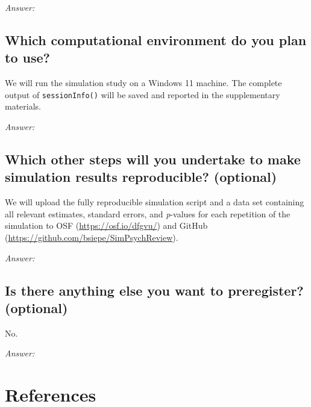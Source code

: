 \documentclass[12pt]{article}
\begin{document}
\textit{Answer:}

\subsection{Which computational environment do you plan to use?}


\begin{examplebox}
We will run the simulation study on a Windows 11 machine. The complete output of \texttt{sessionInfo()} will be saved and reported in the supplementary materials.
\end{examplebox}

\textit{Answer:}

\subsection{Which other steps will you undertake to make simulation results reproducible? \textmd{(optional)}}


\begin{examplebox}
We will upload the fully reproducible simulation script and a data set containing all relevant estimates, standard errors, and \textit{p}-values for each repetition of the simulation to OSF (\url{https://osf.io/dfgvu/}) and GitHub (\url{https://github.com/bsiepe/SimPsychReview}).
\end{examplebox}

\textit{Answer:}

\subsection{Is there anything else you want to preregister? \textmd{(optional)}}


\begin{examplebox}
No.
\end{examplebox}

\textit{Answer:}

\newpage
\section*{References}
\nocite{Siepe2024}
\printbibliography[heading=none]
\end{document}
